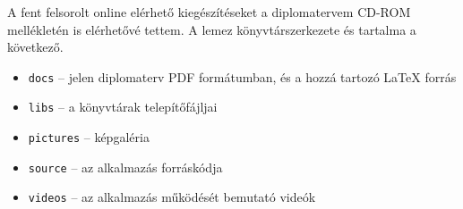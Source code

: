 A fent felsorolt online elérhető kiegészítéseket a diplomatervem CD-ROM mellékletén is elérhetővé tettem. A lemez könyvtárszerkezete és tartalma a következő.

\begin{itemize}
  \item \texttt{docs} -- jelen diplomaterv PDF formátumban, és a hozzá tartozó \LaTeX{} forrás
  \item \texttt{libs} -- a könyvtárak telepítőfájljai
  \item \texttt{pictures} -- képgaléria
  \item \texttt{source} -- az alkalmazás forráskódja
  \item \texttt{videos} -- az alkalmazás működését bemutató videók
\end{itemize}